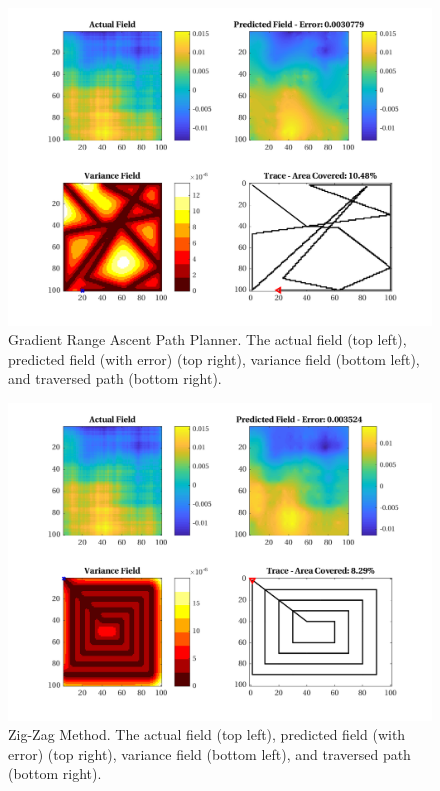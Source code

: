 \begin{figure}[htb!]
    \centering
    \includegraphics[width=0.8\linewidth]{figures/sim_figures/gr_10p_100x100_sf_50_seed_2}
    \captionsetup{skip=0.25\baselineskip}
    \ssp
    \caption{Gradient Range Ascent Path Planner. The actual field (top left), predicted field (with error) (top right), variance field (bottom left), and traversed path (bottom right).}
\end{figure}

\begin{figure}[htb!]
    \centering
    \includegraphics[width=0.8\linewidth]{figures/sim_figures/zz_10p_100x100_sf_50_seed_2}
    \captionsetup{skip=0.25\baselineskip}
    \ssp
    \caption{Zig-Zag Method. The actual field (top left), predicted field (with error) (top right), variance field (bottom left), and traversed path (bottom right).}
\end{figure}
